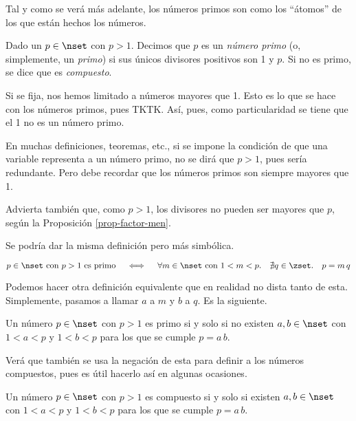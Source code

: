 



Tal y como se verá más adelante, los números primos son como los ``átomos''
de los que están hechos los números.

\begin{deffinition}
  Dado un $p \in \nset$ con $p > 1$. Decimos que $p$ es un \emph{número primo}
  (o, simplemente, un \emph{primo}) si sus únicos divisores positivos son 1 y
  $p$. Si no es primo, se dice que es \emph{compuesto}.
\end{deffinition}

Si se fija, nos hemos limitado a números mayores que 1. Esto es lo que se hace
con los números primos, pues TKTK. Así, pues, como particularidad se tiene que
el 1 no es un número primo.

En muchas definiciones, teoremas, etc., si se impone la condición de que una
variable representa a un número primo, no se dirá que $p > 1$, pues sería
redundante. Pero debe recordar que los números primos son siempre mayores que 1.

Advierta también que, como $p > 1$, los divisores no pueden ser mayores que
$p$, según la Proposición \ref{prop-factor-men}.

Se podría dar la misma definición pero más simbólica.

$$ p \in \nset \ \text{con} \ p > 1 \ \text{es primo} \quad \iff \quad
\forall m \in \nset \ \text{con} \ 1 < m < p. \quad \nexists q \in \zset.
\quad p = m \,q $$

Podemos hacer otra definición equivalente que en realidad no dista tanto de
esta. Simplemente, pasamos a llamar $a$ a $m$ y $b$ a $q$. Es la siguiente.

\begin{proposition}
  Un número $p \in \nset$ con $p > 1$ es primo si y solo si no existen $a, b
  \in \nset$ con $1 < a < p$ y $1 < b < p$ para los que se cumple $p = a \,
  b$.
\end{proposition}

Verá que también se usa la negación de esta para definir a los números
compuestos, pues es útil hacerlo así en algunas ocasiones.

\begin{proposition}
  Un número $p \in \nset$ con $p > 1$ es compuesto si y solo si existen $a,
  b \in \nset$ con $1 < a < p$ y $1 < b < p$ para los que se cumple $p = a
  \, b$.
\end{proposition}

